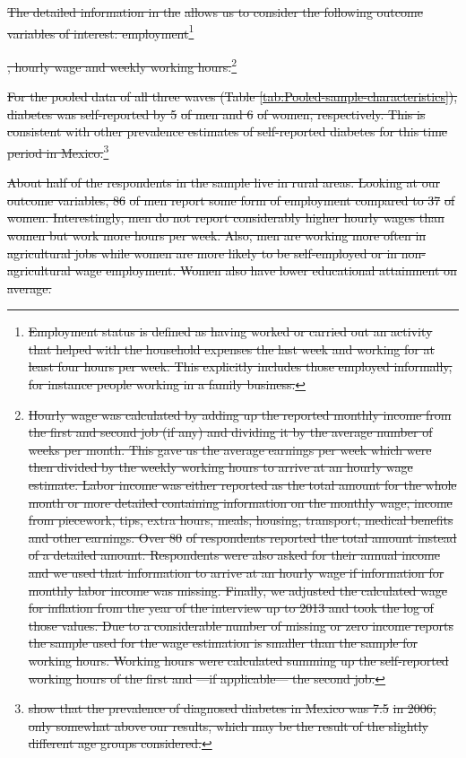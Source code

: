 \documentclass[12pt,english]{article}
\providecommand{\DIFdeltex}[1]{{\protect\color{red}\sout{#1}}}                      %
\providecommand{\DIFdel}[1]{\texorpdfstring{\DIFdeltex{#1}}{}} %
\begin{document}
\DIFdel{The detailed information in the }%
\DIFdel{allows us to consider the following outcome variables of interest: employment}\footnote{\DIFdel{Employment status is defined as having worked or carried out an activity that helped with the household expenses the last week and working for at least four hours per week. This explicitly includes those employed informally, for instance people working in a family business.}}%
\addtocounter{footnote}{-1}%
\DIFdel{, hourly wage and weekly working hours.}\footnote{\DIFdel{Hourly wage was calculated by adding up the reported monthly income from the first and second job (if any) and dividing it by the average number of weeks per month. This gave us the average earnings per week which were then divided by the weekly working hours to arrive at an hourly wage estimate. Labor income was either reported as the total amount for the whole month or more detailed containing information on the monthly wage, income from piecework, tips, extra hours, meals, housing, transport, medical benefits and other earnings. Over 80}%
\DIFdel{of respondents reported the total amount instead of a detailed amount. Respondents were also asked for their annual income and we used that information to arrive at an hourly wage if information for monthly labor income was missing. Finally, we adjusted the calculated wage for inflation from the year of the interview up to 2013 and took the log of those values. Due to a considerable number of missing or zero income reports the sample used for the wage estimation is smaller than the sample for working hours. Working hours were calculated summing up the self-reported working hours of the first and ---if applicable--- the second job.}} %
\addtocounter{footnote}{-1}%
\DIFdel{For the pooled data of all three waves (Table  \ref{tab:Pooled-sample-characteristics}), diabetes was self-reported by 5}%
\DIFdel{of men and 6}%
\DIFdel{of women, respectively. This is consistent with other prevalence estimates of self-reported diabetes for this time period in Mexico.}\footnote{\DIFdel{\textcite{Barquera2013} show that the prevalence of diagnosed diabetes in Mexico was 7.5}%
\DIFdel{in 2006, only somewhat above our results, which may be the result of the slightly different age groups considered.}}  %
\addtocounter{footnote}{-1}%
\DIFdel{About half of the respondents in the sample live in rural areas. Looking at our outcome variables, 86}%
\DIFdel{of men report some form of employment compared to 37}%
\DIFdel{of women. Interestingly, men do not report considerably higher hourly wages than women but work more hours per week. Also, men are working more often in agricultural jobs while women are more likely to be self-employed or in non-agricultural wage employment. Women also have lower educational attainment on average. 
}%
\end{document}
